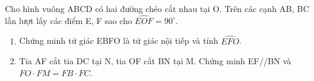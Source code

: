 \begin{ex}
Cho hình vuông ABCD có hai đường chéo cắt nhau tại O. Trên các cạnh AB, BC lần lượt lấy các điểm E, F sao cho $\widehat{EOF} = 90^\circ$.
	\begin{enumerate}
		\item[a)] Chứng minh tứ giác EBFO là tứ giác nội tiếp và tính $\widehat{EFO}$.
		\item[b)] Tia AF cắt tia DC tại N, tia OF cắt BN tại M. Chứng minh EF//BN và $FO \cdot FM = FB \cdot FC$.
	\end{enumerate}
\end{ex}
